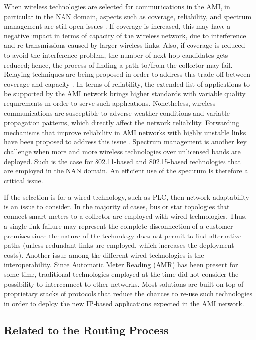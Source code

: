 \documentclass[11pt,draftclsnofoot,onecolumn]{IEEEtran}
\begin{document}
When wireless technologies are selected for communications in the AMI, in particular in the NAN domain, aspects such as coverage, reliability, and spectrum management are still open issues \cite{Sun2012}. If coverage is increased, this may have a negative impact in terms of capacity of the wireless network, due to interference and re-transmissions caused by larger wireless links. Also, if coverage is reduced to avoid the interference problem, the number of next-hop candidates gets reduced; hence, the process of finding a path to/from the collector may fail. Relaying techniques are being proposed in order to address this trade-off between coverage and capacity \cite{Sun2012}. In terms of reliability, the extended list of applications to be supported by the AMI network brings higher standards with variable quality requirements in order to serve such applications. Nonetheless, wireless communications are susceptible to adverse weather conditions and variable propagation patterns, which directly affect the network reliability. Forwarding mechanisms that improve reliability in AMI networks with highly unstable links have been proposed to address this issue \cite{Cespedes2012}. Spectrum management is another key challenge when more and more wireless technologies over unlicensed bands are deployed. Such is the case for 802.11-based and 802.15-based technologies that are employed in the NAN domain. An efficient use of the spectrum is therefore a critical issue.

If the selection is for a wired technology, such as PLC, then network adaptability is an issue to consider. In the majority of cases, bus or star topologies that connect smart meters to a collector are employed with wired technologies. Thus, a single link failure may represent the complete disconnection of a customer premises since the nature of the technology does not permit to find alternative paths (unless redundant links are employed, which increases the deployment costs).  Another issue among the different wired technologies is the interoperability. Since Automatic Meter Reading (AMR) has been present for some time, traditional technologies employed at the time did not consider the possibility to interconnect to other networks. Most solutions are built on top of proprietary stacks of protocols that reduce the chances to re-use such technologies in order to deploy the new IP-based applications expected in the AMI network.

\subsection{Related to the Routing Process}
\end{document}
